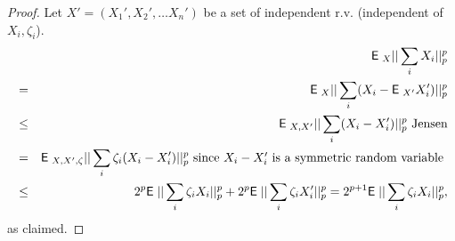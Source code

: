 \documentclass{book}
\numberwithin{exercise}{chapter}
\begin{document}
{\begin{proof}

Let $X'=(X_1',X_2',\ldots X_n')$ be a set of independent r.v.
(independent of $X_i,\zeta_i$).
\begin{eqnarray*}
&&\hbox{{\sf E}\;}_X||\sum_i X_i||_p^p\\
&=& \hbox{{\sf E}\;}_{X} ||\sum_i (X_i-\hbox{{\sf E}\;}_{X'}X'_i)||_p^p\\
&\leq& \hbox{{\sf E}\;}_{X,X'} ||\sum_i (X_i-X'_i)||_p^p \hbox{   Jensen}\\
&=& \hbox{{\sf E}\;}_{X,X',\zeta } ||\sum_i \zeta_i (X_i-X'_i)||_p^p\hbox{  since
$X_i-X'_i$ is a symmetric random variable }\\
&\leq& 2^p\hbox{{\sf E}\;}||\sum_i
\zeta_iX_i||_p^p+2^p\hbox{{\sf E}\;}||\sum_i\zeta_iX'_i||_p^p=2^{p+1}
\hbox{{\sf E}\;}||\sum_i\zeta_iX_i||_p^p,
\end{eqnarray*}
 as claimed.

\end{proof}

}
\end{document}
